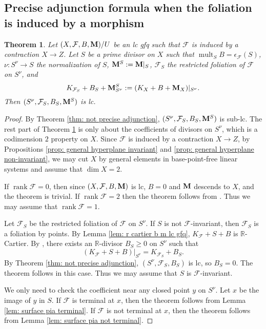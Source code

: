 \documentclass[11pt]{amsart}
\numberwithin{equation}{section}
\newcommand{\Mm}{{\bf{M}}}
\newcommand{\Rr}{\mathbb{R}}
\newcommand{\rk}{\operatorname{rank}}
\newcommand{\mult}{\operatorname{mult}}
\newcommand{\Ff}{\mathcal{F}}
\newtheorem{thm}{Theorem}[subsection]
\theoremstyle{definition}
\theoremstyle{definition}
\theoremstyle{definition}
\begin{document}
\subsection{Precise adjunction formula when the foliation is induced by a morphism}
\begin{thm}\label{thm: adjunction foliation nonnqc}
   Let $(X,\Ff,B,\Mm)/U$ be an lc gfq such that $\Ff$ is induced by a contraction $X\rightarrow Z$. Let $S$ be a prime divisor on $X$ such that $\mult_SB=\epsilon_{\Ff}(S)$, $\nu: S^\nu\rightarrow S$ the normalization of $S$, $\Mm^S:=\Mm|_S$, $\Ff_S$ the restricted foliation of $\Ff$ on $S^\nu$, and
    $$K_{\Ff_S}+B_S+\Mm^S_{S^\nu}:=(K_X+B+\Mm_X)|_{S^\nu}.$$
    Then $(S^\nu,\Ff_S,B_S,\Mm^S)$ is lc.    
\end{thm}
\begin{proof}
    By Theorem \ref{thm: not precise adjunction}, $(S^\nu,\Ff_S,B_S,\Mm^S)$ is sub-lc.  The rest part of Theorem \ref{thm: adjunction foliation nonnqc} is only about the coefficients of divisors on $S^\nu$, which is a codimension $2$ property on $X$. Since $\Ff$ is induced by a contraction $X\rightarrow Z$, by Propositions \ref{prop: general hyperplane invariant} and \ref{prop: general hyperplane non-invariant}, we may cut $X$ by general elements in base-point-free linear systems and assume that $\dim X=2$.

If $\rk\Ff=0$, then since $(X,\Ff,B,\Mm)$ is lc, $B=0$ and $\Mm$ descends to $X$, and the theorem is trivial. If $\rk\Ff=2$ then the theorem follows from \cite[Definition 4.7]{BZ16}. Thus we may assume that $\rk\Ff=1$. 

Let $\Ff_S$ be the restricted foliation of $\Ff$ on $S^\nu$. If $S$ is not $\Ff$-invariant, then $\Ff_S$ is a foliation by points. By Lemma \ref{lem: r cartier b m lc gfq}, $K_{\Ff}+S+B$ is $\Rr$-Cartier. By \cite[Proposition 3.4]{Spi20}, there exists an $\Rr$-divisor $B_S\geq 0$ on $S^\nu$ such that
$$(K_{\Ff}+S+B)|_{S^\nu}=K_{\Ff_S}+B_S.$$ 
By Theorem \ref{thm: not precise adjunction}, $(S^\nu,\Ff_S,B_S)$ is lc, so $B_S=0$. The theorem follows in this case. Thus we may assume that $S$ is $\Ff$-invariant.

We only need to check the coefficient near any closed point $y$ on $S^\nu$. Let $x$ be the image of $y$ in $S$. If $\Ff$ is terminal at $x$, then the theorem follows from Lemma \ref{lem: surface pia terminal}. If $\Ff$ is not terminal at $x$, then the theorem follows from Lemma \ref{lem: surface pia not terminal}.
\end{proof}
\end{document}
